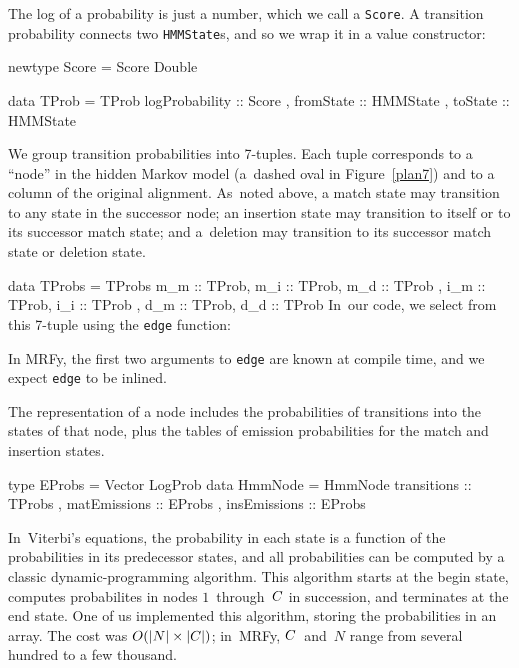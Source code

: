 \documentclass[nonatbib]{sigplanconf}
\newcommand\alignwidth{\ensuremath C} %
\newcommand\figref[1]{Figure~\ref{#1}}
\newenvironment{smallverbatim}{\par\small\verbatim}{\endverbatim}
\newcommand\smallverbatiminput[1]{{\par\unskip\small}}
\begin{document}
The log of a probability is just a number, which we call a \texttt{Score}.
A transition probability connects two \texttt{HMMState}s, and so we wrap it in
a value constructor:
\begin{smallverbatim}
newtype Score = Score Double

data TProb =
     TProb { logProbability :: Score
           , fromState :: HMMState
           , toState :: HMMState
           }

\end{smallverbatim}
We group transition probabilities into 7-tuples.
Each tuple corresponds to a ``node'' in the hidden Markov model
(a~dashed oval in \figref{plan7}) and to a column of the original
alignment.
As~noted above, 
a match state may transition to any state in the successor node;
an insertion state may transition to itself or to its successor match
state;
and
a~deletion may transition to its successor match
state or deletion state.
\begin{smallverbatim}
data TProbs = 
     TProbs { m_m :: TProb, m_i :: TProb, m_d :: TProb
            , i_m :: TProb, i_i :: TProb
            , d_m :: TProb, d_d :: TProb }
\end{smallverbatim}
In~our code, we select from this 7-tuple using the \texttt{edge}
function:
\smallverbatiminput{edge}
In MRFy, the first two arguments to \texttt{edge} are known at compile
time, and we expect \texttt{edge} to be inlined.

The representation of a node includes the probabilities of transitions
into the states of that node, plus the tables
of emission probabilities for the match and insertion states.
\begin{smallverbatim}
type EProbs  = Vector LogProb
data HmmNode = HmmNode { transitions  :: TProbs
                       , matEmissions :: EProbs
                       , insEmissions :: EProbs
                       }
\end{smallverbatim}

In~Viterbi's equations,
the probability in each state is a function of the probabilities
in its predecessor states, 
and all probabilities can be computed by a classic dynamic-programming
algorithm.
This algorithm starts at the begin state,
computes probabilites in nodes $1$~through~$\alignwidth$ in
succession, and terminates at the end state.
One of us implemented this algorithm, storing the probabilities in an array.
The cost was
$O(|N|\times|\alignwidth|)$;
in~MRFy, $\alignwidth$~and~$N$ range from several hundred to a few
thousand.
\end{document}
